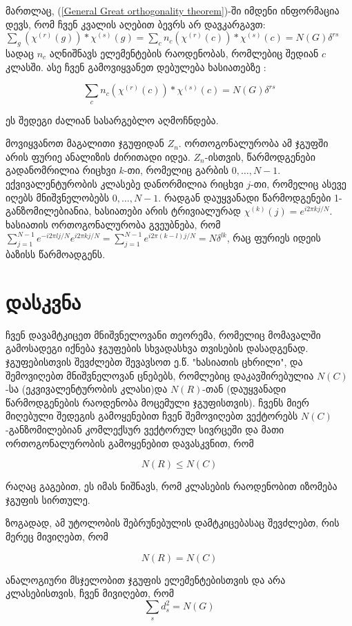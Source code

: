 \documentclass[12pt]{article}
\begin{document}
\begin{sloppypar}
მართლაც, (\ref{General Great orthogonality theorem})-ში იმდენი ინფორმაცია დევს, რომ ჩვენ კვალის აღებით ბევრს არ დავკარგავთ: 
$
\sum_g(\chi^{(r)}(g))*\chi^{(s)}(g) = 
\sum_c n_c(\chi^{(r)}(c))*\chi^{(s)}(c) = 
N(G)\delta^{rs}
$
სადაც $n_c$ აღნიშნავს ელემენტების რაოდენობას, რომლებიც შედიან $c$ კლასში. ასე ჩვენ გამოვიყვანეთ დებულება ხასიათებზე :

\begin{equation} \label{Character orthogonality theorem}
		\sum_c n_c(\chi^{(r)}(c))*\chi^{(s)}(c)=  N(G)\delta^{rs}
\end{equation}

ეს შედეგი ძალიან სასარგებლო აღმოჩნდება.

მოვიყვანოთ მაგალითი ჯგუფიდან $Z_n$. ორთოგონალურობა ამ ჯგუფში არის ფურიე ანალიზის ძირითადი იდეა. $Z_n$-ისთვის, წარმოდგენები გადანომრილია რიცხვი $k$-თი, რომელიც გარბის $0,\dots,N-1$. ექვივალენტურობის კლასებე დანორმილია რიცხვი $j$-თი, რომელიც ასევე იღებს მნიშვნელობებს $0,\dots,N-1$. რადგან დაუყვანადი წარმოდგენები 1-განზომილებიანია, ხასიათები არის ტრივიალურად $\chi^{(k)}(j) = e^{i2 \pi kj/N}$. ხასიათის ორთოგონალურობა გვეუბნება, რომ 
$
\sum_{j=1}^{N-1}e^{-i2 \pi lj/N}e^{i2 \pi kj/N} = 
\sum_{j=1}^{N-1}e^{i2 \pi (k-l)j/N} = 
N \delta^{lk}
$, რაც ფურიეს იდეის ბაზისს წარმოადგენს.

\newpage
\section{დასკვნა}
ჩვენ დავამტკიცეთ მნიშვნელოვანი თეორემა, რომელიც მომავალში გამოსადეგი იქნება ჯგუფების სხვადასხვა თვისების დასადგენად.\\

ჯგუფებისთვის შევძლებთ შევავსოთ ე.წ. "ხასიათის ცხრილი", და შემოვიღებთ მნიშვნელოვან ცნებებს, რომლებიც დაკავშირებულია $N(C)$-სა (ეკვივალენტურობის კლასი)და $N(R)$-თან (დაუყვანადი წარმოდგენების რაოდენობა მოცემული ჯგუფისთვის). ჩვენს მიერ მიღებული შედეგის გამოყენებით ჩვენ შემოვიღებთ ვექტორებს $N(C)$-განზომილებიან კომლექსურ ვექტორულ სივრცეში და მათი ორთოგონალურობის გამოყენებით დავასკვნით, რომ 

$$ N(R) \leq N(C)$$

რაღაც გაგებით, ეს იმას ნიშნავს, რომ კლასების რაოდენობით იზომება ჯგუფის სირთულე.

ზოგადად, ამ უტოლობის შებრუნებულის დამტკიცებასაც შევძლებთ, რის მერეც მივიღებთ, რომ 

$$ N(R) = N(C)$$

ანალოგიური მსჯელობით ჯგუფის ელემენტებისთვის და არა კლასებისთვის, ჩვენ მივიღებთ, რომ 
$$ \sum_s d^2_s = N(G)$$


\end{sloppypar}
\end{document}
